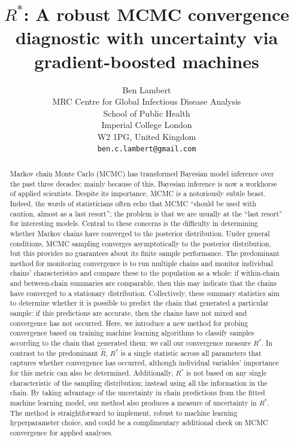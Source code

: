 \documentclass{article}
\title{$R^*$: A robust MCMC convergence diagnostic with uncertainty via gradient-boosted machines}
\author{%
	 Ben Lambert\\
	 MRC Centre for Global Infectious Disease Analysis\\
	 School of Public Health\\
	 Imperial College London\\
	 W2 1PG, United Kingdom\\
	 \texttt{ben.c.lambert@gmail.com} \\
}
\begin{document}

\maketitle

\begin{abstract}
	Markov chain Monte Carlo (MCMC) has transformed Bayesian model inference over the past three decades: mainly because of this, Bayesian inference is now a workhorse of applied scientists. Despite its importance, MCMC is a notoriously subtle beast. Indeed, the words of statisticians often echo that MCMC ``should be used with caution, almost as a last resort''; the problem is that we are usually at the ``last resort'' for interesting models. Central to these concerns is the difficulty in determining whether Markov chains have converged to the posterior distribution. Under general conditions, MCMC sampling converges asymptotically to the posterior distribution, but this provides no guarantees about its finite sample performance. The predominant method for monitoring convergence is to run multiple chains and monitor individual chains' characteristics and compare these to the population as a whole: if within-chain and between-chain summaries are comparable, then this may indicate that the chains have converged to a stationary distribution. Collectively, these summary statistics aim to determine whether it is possible to predict the chain that generated a particular sample: if this predictions are accurate, then the chains have not mixed and convergence has not occurred. Here, we introduce a new method for probing convergence based on training machine learning algorithms to classify samples according to the chain that generated them: we call our convergence measure $R^*$. In contrast to the predominant $\hat{R}$, $R^*$ is a single statistic across all parameters that captures whether convergence has occurred, although individual variables' importance for this metric can also be determined. Additionally, $R^*$ is not based on any single characteristic of the sampling distribution; instead using all the information in the chain. By taking advantage of the uncertainty in chain predictions from the fitted machine learning model, our method also produces a measure of uncertainty in $R^*$. The method is straightforward to implement, robust to machine learning hyperparameter choice, and could be a complimentary additional check on MCMC convergence for applied analyses.
\end{abstract}
\end{document}
